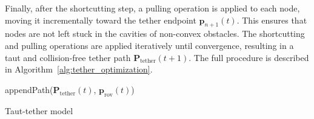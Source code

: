 Finally, after the shortcutting step, a pulling operation is applied to each node, moving it incrementally toward the tether endpoint \( \mathbf{p}_{n+1}(t) \). This ensures that nodes are not left stuck in the cavities of non-convex obstacles. The shortcutting and pulling operations are applied iteratively until convergence, resulting in a taut and collision-free tether path \( \mathbf{P}_{\mathrm{tether}}(t+1) \). The full procedure is described in Algorithm~\ref{alg:tether_optimization}.









\begin{algorithm}[t]
\LinesNotNumbered  %

\BlankLine

appendPath($\mathbf{P}_{\mathrm{tether}}(t)$, $\mathbf{p}_{\mathrm{rov}}(t)$)\;

\;
\caption{Taut-tether model}
\label{alg:tether_optimization}
\end{algorithm}




